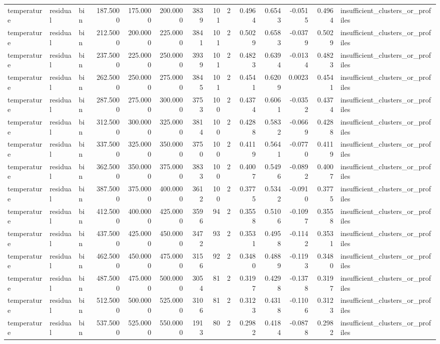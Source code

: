 \begin{tabular}{lllrrrrrrrrrrl}
temperature & residual & bin & 187.5000 & 175.0000 & 200.0000 & 3839 & 101 & 2 & 0.4964 & 0.6543 & -0.0515 & 0.4964 & insufficient_clusters_or_profiles \\
temperature & residual & bin & 212.5000 & 200.0000 & 225.0000 & 3841 & 101 & 2 & 0.5029 & 0.6583 & -0.0379 & 0.5029 & insufficient_clusters_or_profiles \\
temperature & residual & bin & 237.5000 & 225.0000 & 250.0000 & 3939 & 101 & 2 & 0.4823 & 0.6394 & -0.0134 & 0.4823 & insufficient_clusters_or_profiles \\
temperature & residual & bin & 262.5000 & 250.0000 & 275.0000 & 3845 & 101 & 2 & 0.4541 & 0.6209 & 0.0023 & 0.4541 & insufficient_clusters_or_profiles \\
temperature & residual & bin & 287.5000 & 275.0000 & 300.0000 & 3753 & 100 & 2 & 0.4374 & 0.6061 & -0.0352 & 0.4374 & insufficient_clusters_or_profiles \\
temperature & residual & bin & 312.5000 & 300.0000 & 325.0000 & 3814 & 100 & 2 & 0.4288 & 0.5832 & -0.0669 & 0.4288 & insufficient_clusters_or_profiles \\
temperature & residual & bin & 337.5000 & 325.0000 & 350.0000 & 3750 & 100 & 2 & 0.4119 & 0.5641 & -0.0770 & 0.4119 & insufficient_clusters_or_profiles \\
temperature & residual & bin & 362.5000 & 350.0000 & 375.0000 & 3833 & 100 & 2 & 0.4007 & 0.5496 & -0.0892 & 0.4007 & insufficient_clusters_or_profiles \\
temperature & residual & bin & 387.5000 & 375.0000 & 400.0000 & 3612 & 100 & 2 & 0.3775 & 0.5342 & -0.0910 & 0.3775 & insufficient_clusters_or_profiles \\
temperature & residual & bin & 412.5000 & 400.0000 & 425.0000 & 3596 & 94 & 2 & 0.3558 & 0.5106 & -0.1097 & 0.3558 & insufficient_clusters_or_profiles \\
temperature & residual & bin & 437.5000 & 425.0000 & 450.0000 & 3472 & 93 & 2 & 0.3531 & 0.4958 & -0.1142 & 0.3531 & insufficient_clusters_or_profiles \\
temperature & residual & bin & 462.5000 & 450.0000 & 475.0000 & 3156 & 92 & 2 & 0.3480 & 0.4889 & -0.1193 & 0.3480 & insufficient_clusters_or_profiles \\
temperature & residual & bin & 487.5000 & 475.0000 & 500.0000 & 3054 & 81 & 2 & 0.3197 & 0.4298 & -0.1378 & 0.3197 & insufficient_clusters_or_profiles \\
temperature & residual & bin & 512.5000 & 500.0000 & 525.0000 & 3106 & 81 & 2 & 0.3123 & 0.4318 & -0.1106 & 0.3123 & insufficient_clusters_or_profiles \\
temperature & residual & bin & 537.5000 & 525.0000 & 550.0000 & 1913 & 80 & 2 & 0.2982 & 0.4184 & -0.0878 & 0.2982 & insufficient_clusters_or_profiles \\
\bottomrule
\end{tabular}
